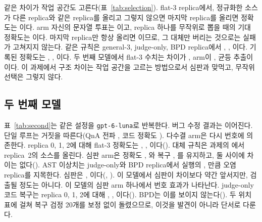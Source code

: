 \documentclass[11pt]{article}
\begin{document}
같은 차이가 작업 공간도 고른다(표~\ref{tab:selection}).
flat-3 replica에서, 정규화한 소스가 다른 replica와 같은 replica를 올리고 그렇지 않으면 마지막 replica를 올리면 정확도는 \RateSelMainFlatThreeCodeAst{}이다. arm 자신의 문자열 투표는 \RateSelMainFlatThreeCodeActual{}이고, replica 하나를 무작위로 뽑을 때의 기대 정확도는 \RateSelMainFlatThreeCodeUniform{}이다.
마지막 replica만 항상 올리면 \RateSelMainFlatThreeCodeLast{}이므로, 그 대체만 버리는 것으로는 실패가 고쳐지지 않는다.
같은 규칙은 general-3, judge-only, BPD replica에서 \RateSelMainGenThreeCodeAst{}, \RateSelMainJudgeOnlyCodeAst{}, \RateSelMainBpdCodeAst{}이다. 기록된 정확도는 \RateSelMainGenThreeCodeActual{}, \RateSelMainJudgeOnlyCodeActual{}, \RateSelMainBpdCodeActual{}이다.
두 번째 모델에서 flat-3 수치는 차이가 \RateSelBEightFlatThreeCodeAst{}, arm이 \RateSelBEightFlatThreeCodeActual{}, 균등 추출이 \RateSelBEightFlatThreeCodeUniform{}이다.
이 과제에서 구조 차이는 작업 공간을 고르는 방법으로서 심판과 맞먹고, 무작위 선택은 그렇지 않다.



\subsection{두 번째 모델}
\label{sec:second}


표~\ref{tab:second}는 같은 설정을 \texttt{gpt-6-luna}로 반복한다.
버그 수정 결과는 이어진다.
단일 루프는 거짓을 따른다(QnA 전파 \RateBEightGenOneQnaProp{}, 코드 정확도 \RateBEightGenOneCodeAcc{}).
다수결 arm은 다시 번호에 의존한다. replica 0, 1, 2에 대해 flat-3 정확도는 \RatePosBEightFlatThreeCodeAccZero{}, \RatePosBEightFlatThreeCodeAccOne{}, \RatePosBEightFlatThreeCodeAccTwo{}이다(\PvalPosBEightFlatThreeCodeAcc{}). 대체 규칙은 과제의 \RateFbBEightFlatThreeCodeLast{}에서 replica~2의 소스를 올린다.
심판 arm은 정확도 \RateBEightJudgeOnlyCodeAcc{}, \RateBEightBpdCodeAcc{}와 복구 \RateBEightJudgeOnlyCodeRec{}, \RateBEightBpdCodeRec{}를 유지하고, 둘 사이에 차이는 없다(\PvalBEightCodeRecJudgeOnlyvsBpd{}).
AST 이상치는 judge-only와 BPD replica에서 실행의 \RateSemBEightJudgeOnlyCodeAst{}, \RateSemBEightBpdCodeAst{}만큼 오염 replica를 지목한다. 심판은 \RateSemBEightJudgeOnlyCodeMethod{}, \RateSemBEightBpdCodeMethod{}이다(\PvalSemBEightJudgeOnlyCodeMethodVsAst{}, \PvalSemBEightBpdCodeMethodVsAst{}).
이 모델에서 심판이 차이보다 약간 앞서지만, 검출될 정도는 아니다.
이 모델의 심판 arm 하나에서 번호 효과가 나타난다. judge-only 코드 복구는 replica 0, 1, 2에 대해 \RatePosBEightJudgeOnlyCodeRecZero{}, \RatePosBEightJudgeOnlyCodeRecOne{}, \RatePosBEightJudgeOnlyCodeRecTwo{}이다(\PvalPosBEightJudgeOnlyCodeRec{}). BPD는 이를 보이지 않는다(\PvalPosBEightBpdCodeRec{}). 두 위치 표에 걸쳐 복구 검정 20개를 보정 없이 돌렸으므로, 이것을 발견이 아니라 단서로 다룬다.
\end{document}
